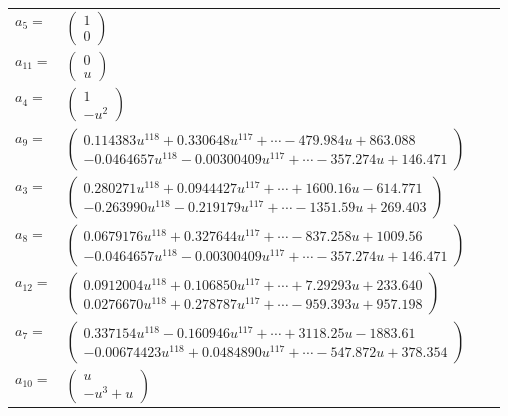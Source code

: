 \documentclass[1p]{elsarticle_modified}
\theoremstyle{definition}
\begin{document}
\begin{tabular}{m{7pt} m{180pt} m{7pt} m{180pt} }
\flushright $a_{5}=$&$\begin{pmatrix}1\\0\end{pmatrix}$ \\
\flushright $a_{11}=$&$\begin{pmatrix}0\\u\end{pmatrix}$ \\
\flushright $a_{4}=$&$\begin{pmatrix}1\\- u^2\end{pmatrix}$ \\
\flushright $a_{9}=$&$\begin{pmatrix}0.114383 u^{118}+0.330648 u^{117}+\cdots-479.984 u+863.088\\-0.0464657 u^{118}-0.00300409 u^{117}+\cdots-357.274 u+146.471\end{pmatrix}$ \\
\flushright $a_{3}=$&$\begin{pmatrix}0.280271 u^{118}+0.0944427 u^{117}+\cdots+1600.16 u-614.771\\-0.263990 u^{118}-0.219179 u^{117}+\cdots-1351.59 u+269.403\end{pmatrix}$ \\
\flushright $a_{8}=$&$\begin{pmatrix}0.0679176 u^{118}+0.327644 u^{117}+\cdots-837.258 u+1009.56\\-0.0464657 u^{118}-0.00300409 u^{117}+\cdots-357.274 u+146.471\end{pmatrix}$ \\
\flushright $a_{12}=$&$\begin{pmatrix}0.0912004 u^{118}+0.106850 u^{117}+\cdots+7.29293 u+233.640\\0.0276670 u^{118}+0.278787 u^{117}+\cdots-959.393 u+957.198\end{pmatrix}$ \\
\flushright $a_{7}=$&$\begin{pmatrix}0.337154 u^{118}-0.160946 u^{117}+\cdots+3118.25 u-1883.61\\-0.00674423 u^{118}+0.0484890 u^{117}+\cdots-547.872 u+378.354\end{pmatrix}$ \\
\flushright $a_{10}=$&$\begin{pmatrix}u\\- u^3+u\end{pmatrix}$ \\

\end{tabular}
\end{document}
